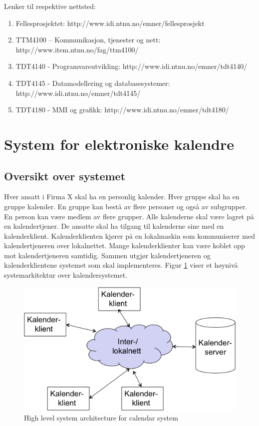 \documentclass[a4paper]{scrartcl}
\begin{document}
Lenker til respektive nettsted:
\begin{enumerate}
\item Fellesprosjektet: http://www.idi.ntnu.no/emner/fellesprosjekt

\item TTM4100 – Kommunikasjon, tjenester og nett: http://www.item.ntnu.no/fag/ttm4100/ 

\item TDT4140 - Programvareutvikling: http://www.idi.ntnu.no/emner/tdt4140/

\item TDT4145 - Datamodellering og databasesystemer: http://www.idi.ntnu.no/emner/tdt4145/

\item TDT4180 - MMI og grafikk: http://www.idi.ntnu.no/emner/tdt4180/
\end{enumerate}

\section{System for elektroniske kalendre}
\subsection{Oversikt over systemet}

Hver ansatt i Firma X skal ha en personlig kalender. Hver gruppe skal ha en gruppe kalender. En gruppe kan bestå av flere personer og også av subgrupper. En person kan være medlem av flere grupper. Alle kalenderne skal være lagret på en kalendertjener. De ansatte skal ha tilgang til kalenderne sine med en kalenderklient. Kalenderklienten kjører på en lokalmaskin som kommuniserer med kalendertjeneren over lokalnettet. Mange kalenderklienter kan være koblet opp mot kalendertjeneren samtidig. Sammen utgjør kalendertjeneren og kalenderklientene systemet som skal implementeres.
Figur \ref{fig:high-level-architecture}  viser et høynivå systemarkitektur over kalendersystemet.

\begin{figure}[H]
    \centering
    \includegraphics[scale=0.5]{resources/high-level-architecture.png}
    \caption{High level system architecture for calendar system}
    \label{fig:high-level-architecture}
\end{figure}
\end{document}

